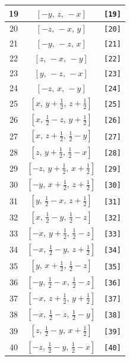 \documentclass[fleqn,8pt]{jsarticle}
\begin{document}
\begin{longtable}{ccc}
19 & $\left[ - y,\, z,\, - x \right]$ & {\tt [19]} \\ \hline
20 & $\left[ - z,\, - x,\, y \right]$ & {\tt [20]} \\ \hline
21 & $\left[ - y,\, - z,\, x \right]$ & {\tt [21]} \\ \hline
22 & $\left[ z,\, - x,\, - y \right]$ & {\tt [22]} \\ \hline
23 & $\left[ y,\, - z,\, - x \right]$ & {\tt [23]} \\ \hline
24 & $\left[ - z,\, x,\, - y \right]$ & {\tt [24]} \\ \hline
25 & $\left[ x,\, y + \frac{1}{2},\, z + \frac{1}{2} \right]$ & {\tt [25]} \\ \hline
26 & $\left[ x,\, \frac{1}{2} - z,\, y + \frac{1}{2} \right]$ & {\tt [26]} \\ \hline
27 & $\left[ x,\, z + \frac{1}{2},\, \frac{1}{2} - y \right]$ & {\tt [27]} \\ \hline
28 & $\left[ z,\, y + \frac{1}{2},\, \frac{1}{2} - x \right]$ & {\tt [28]} \\ \hline
29 & $\left[ - z,\, y + \frac{1}{2},\, x + \frac{1}{2} \right]$ & {\tt [29]} \\ \hline
30 & $\left[ - y,\, x + \frac{1}{2},\, z + \frac{1}{2} \right]$ & {\tt [30]} \\ \hline
31 & $\left[ y,\, \frac{1}{2} - x,\, z + \frac{1}{2} \right]$ & {\tt [31]} \\ \hline
32 & $\left[ x,\, \frac{1}{2} - y,\, \frac{1}{2} - z \right]$ & {\tt [32]} \\ \hline
33 & $\left[ - x,\, y + \frac{1}{2},\, \frac{1}{2} - z \right]$ & {\tt [33]} \\ \hline
34 & $\left[ - x,\, \frac{1}{2} - y,\, z + \frac{1}{2} \right]$ & {\tt [34]} \\ \hline
35 & $\left[ y,\, x + \frac{1}{2},\, \frac{1}{2} - z \right]$ & {\tt [35]} \\ \hline
36 & $\left[ - y,\, \frac{1}{2} - x,\, \frac{1}{2} - z \right]$ & {\tt [36]} \\ \hline
37 & $\left[ - x,\, z + \frac{1}{2},\, y + \frac{1}{2} \right]$ & {\tt [37]} \\ \hline
38 & $\left[ - x,\, \frac{1}{2} - z,\, \frac{1}{2} - y \right]$ & {\tt [38]} \\ \hline
39 & $\left[ z,\, \frac{1}{2} - y,\, x + \frac{1}{2} \right]$ & {\tt [39]} \\ \hline
40 & $\left[ - z,\, \frac{1}{2} - y,\, \frac{1}{2} - x \right]$ & {\tt [40]} \\ \hline

\end{longtable}
\end{document}
